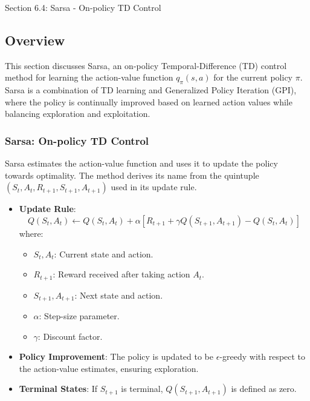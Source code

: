 \begin{notes}{Section 6.4: Sarsa - On-policy TD Control}
    \subsection*{Overview}

    This section discusses Sarsa, an on-policy Temporal-Difference (TD) control method for learning the action-value function $q_\pi(s, a)$ for the current policy $\pi$. Sarsa is a combination of TD 
    learning and Generalized Policy Iteration (GPI), where the policy is continually improved based on learned action values while balancing exploration and exploitation.
    
    \subsubsection*{Sarsa: On-policy TD Control}
    
    Sarsa estimates the action-value function and uses it to update the policy towards optimality. The method derives its name from the quintuple $(S_t, A_t, R_{t+1}, S_{t+1}, A_{t+1})$ used in its update rule.
    
    \begin{highlight}
    
        \begin{itemize}
            \item \textbf{Update Rule}:
            \[
            Q(S_t, A_t) \leftarrow Q(S_t, A_t) + \alpha \left[ R_{t+1} + \gamma Q(S_{t+1}, A_{t+1}) - Q(S_t, A_t) \right]
            \]
            where:
            \begin{itemize}
                \item $S_t, A_t$: Current state and action.
                \item $R_{t+1}$: Reward received after taking action $A_t$.
                \item $S_{t+1}, A_{t+1}$: Next state and action.
                \item $\alpha$: Step-size parameter.
                \item $\gamma$: Discount factor.
            \end{itemize}
            \item \textbf{Policy Improvement}: The policy is updated to be $\epsilon$-greedy with respect to the action-value estimates, ensuring exploration.
            \item \textbf{Terminal States}: If $S_{t+1}$ is terminal, $Q(S_{t+1}, A_{t+1})$ is defined as zero.
        \end{itemize}
    

\end{highlight}
\end{notes}
